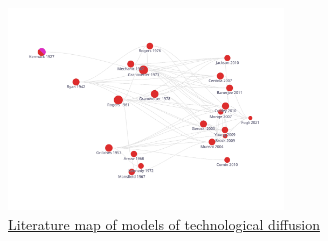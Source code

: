 \begin{figure}[!ht] \centering  %
	\caption{\href{https://app.litmaps.co/shared/1D9003CB-75FE-4633-B60A-79B70E03B691}{Literature map of models of technological diffusion}}
	\label{fig:graph_diffusion}
	\centerline{\includegraphics[width=0.65\textwidth]{./figures/graph_diffusion}}
\end{figure}